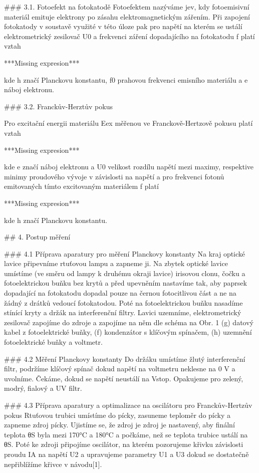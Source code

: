 \documentclass{article}
\begin{document}
### 3.1. Fotoefekt na fotokatodě
Fotoefektem nazýváme jev, kdy fotoemisivní materiál emituje elektrony po zásahu elektromagnetickým zářením.
Při zapojení fotokatody v soustavě využité v této úloze pak pro napětí na kterém se ustálí elektrometrický zesilovač
U0 a frekvenci záření dopadajícího na fotokatodu f platí vztah

***Missing expresion***

kde h značí Planckovu konstantu, f0 prahovou frekvenci emisního materiálu a e náboj elektronu.

### 3.2. Franckův-Herztův pokus

Pro excitační energii materiálu Eex měřenou ve Franckově-Hertzově pokusu platí vztah

***Missing expresion***

kde e značí náboj elektronu a U0 velikost rozdílu napětí mezi maximy, respektive minimy proudového vývoje
v závislosti na napětí a pro frekvenci fotonů emitovaných tímto excitovaným materiálem f platí

***Missing expresion***

kde h značí Planckovu konstantu.


## 4. Postup měření

### 4.1 Příprava aparatury pro měření Planckovy konstanty
Na kraj optické lavice připevníme rtuťovou lampu a zapneme ji. Na zbytek optické lavice umístíme (ve směru
od lampy k druhému okraji lavice) irisovou clonu, čočku a fotoelektrickou buňku bez krytů a před upevněním
nastavíme tak, aby paprsek dopadající na fotokatodu dopadal pouze na černou fotocitlivou část a ne na žádný
z drátků vedoucí fotokatodou. Poté na fotoelektrickou buňku nasadíme stínící kryty a držák na interferenční filtry.
Lavici uzemníme, elektrometrický zesilovač zapojíme do zdroje a zapojíme na něm dle schéma na Obr. 1 (g) datový
kabel z fotoelektrické buňky, (f) kondenzátor s klíčovým spínačem, (h) uzemnění fotoelektrické buňky a voltmetr.


### 4.2 Měření Planckovy konstanty
Do držáku umístíme žlutý interferenční filtr, podržíme klíčový spínač dokud napětí na voltmetru neklesne na
0 V a uvolníme. Čekáme, dokud se napětí neustálí na Vstop. Opakujeme pro zelený, modrý, fialový a UV filtr.

### 4.3 Příprava aparatury a optimalizace na oscilátoru pro Franckův-Hertzův pokus
Rtuťovou trubici umístíme do pícky, zasuneme teploměr do pícky a zapneme zdroj pícky. Ujistíme se, že zdroj je
zdroj je nastavený, aby finální teplota θS byla mezi 170°C a 180°C a počkáme, než se teplota trubice ustálí na θS.
Poté ke zdroji připojíme oscilátor, na kterém pozorujeme křivku závislosti proudu IA na napětí U2 a upravujeme
parametry U1 a U3 dokud se dostatečně nepřiblížíme křivce v návodu[1].
\end{document}
